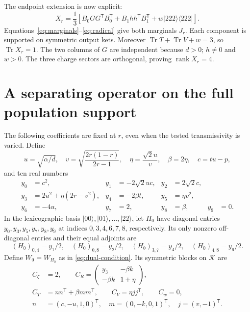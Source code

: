 \documentclass[11pt]{article}
\newcommand{\ket}[1]{\lvert #1\rangle}
\newcommand{\bra}[1]{\langle #1\rvert}
\newcommand{\Tr}{\operatorname{Tr}}
\newcommand{\K}{\mathcal K}
\begin{document}
The endpoint extension is now explicit:
\begin{equation}\label{eq:endpoint-X}
X_r=\frac13\left[B_0GG^{\mathsf T}B_0^{\mathsf T}
+B_1hh^{\mathsf T}B_1^{\mathsf T}
+w\ket{222}\bra{222}\right].
\end{equation}
Equations~\eqref{eq:marginals}--\eqref{eq:radical} give both marginals
$J_r$. Each component is supported on symmetric output kets.
Moreover $\Tr T+\Tr V+w=3$, so $\Tr X_r=1$.
The two columns of $G$ are independent because $d>0$; $h\ne0$ and $w>0$.
The three charge sectors are orthogonal, proving $\operatorname{rank}X_r=4$.

\section{A separating operator on the full population support}\label{sec:face}
The following coefficients are fixed at $r$, even when the tested
transmissivity is varied. Define
\begin{equation}\label{eq:dual-parameters}
u=\sqrt{\alpha/d},\quad
v=\sqrt{\frac{2r(1-r)}{2r-1}},\quad
\eta=\frac{\sqrt2u}{v},\quad \beta=2\eta,\quad c=tu-p,
\end{equation}
and ten real numbers
\begin{equation}\label{eq:y}
\begin{aligned}
y_0&=c^2,& y_1&=-2\sqrt2uc,& y_2&=2\sqrt2c,\\
y_3&=2u^2+\eta(2r-v^2),& y_4&=-2\beta t,& y_5&=\eta v^2,\\
y_6&=-4u,& y_7&=2,&y_8&=\beta,&y_9&=0.
\end{aligned}
\end{equation}
In the lexicographic basis $\ket{00},\ket{01},\ldots,\ket{22}$,
let $H_0$ have diagonal entries $y_0,y_3,y_5,y_7,y_8,y_9$ at
indices $0,3,4,6,7,8$, respectively. Its only nonzero off-diagonal
entries and their equal adjoints are
\begin{equation}\label{eq:H0}
(H_0)_{0,4}=y_1/2,\quad (H_0)_{0,8}=y_2/2,\quad
(H_0)_{3,7}=y_4/2,\quad (H_0)_{4,8}=y_6/2.
\end{equation}
Define $W_0=W_{H_0}$ as in \eqref{eq:dual-condition}.
Its symmetric blocks on $\K$ are
\begin{equation}\label{eq:dual-blocks}
\begin{split}
C_\zeta&=2,\qquad
C_R=\begin{pmatrix}y_3&-\beta k\\-\beta k&1+\eta\end{pmatrix},\\
C_T&=nn^{\mathsf T}+\beta mm^{\mathsf T},\qquad
C_V=\eta jj^{\mathsf T},\qquad C_w=0,\\
n&=(c,-u,1,0)^{\mathsf T},\quad
m=(0,-k,0,1)^{\mathsf T},\quad j=(v,-1)^{\mathsf T}.
\end{split}
\end{equation}
\end{document}
